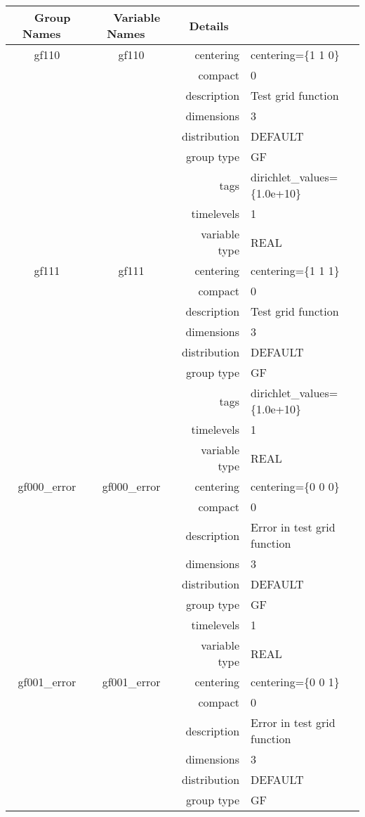 \begin{tabular*}{150mm}{|c|c@{\extracolsep{\fill}}|rl|} \hline 
~ {\bf Group Names} ~ & ~ {\bf Variable Names} ~  &{\bf Details} ~ & ~ \\ 
\hline 
gf110 & gf110 & centering & centering=\{1 1 0\} \\ 
 &  & compact & 0 \\ 
 &  & description & Test grid function \\ 
 &  & dimensions & 3 \\ 
 &  & distribution & DEFAULT \\ 
 &  & group type & GF \\ 
 &  & tags & dirichlet\_values=\{1.0e+10\} \\ 
 &  & timelevels & 1 \\ 
 &  & variable type & REAL \\ 
\hline 
gf111 & gf111 & centering & centering=\{1 1 1\} \\ 
 &  & compact & 0 \\ 
 &  & description & Test grid function \\ 
 &  & dimensions & 3 \\ 
 &  & distribution & DEFAULT \\ 
 &  & group type & GF \\ 
 &  & tags & dirichlet\_values=\{1.0e+10\} \\ 
 &  & timelevels & 1 \\ 
 &  & variable type & REAL \\ 
\hline 
gf000\_error & gf000\_error & centering & centering=\{0 0 0\} \\ 
 &  & compact & 0 \\ 
 &  & description & Error in test grid function \\ 
 &  & dimensions & 3 \\ 
 &  & distribution & DEFAULT \\ 
 &  & group type & GF \\ 
 &  & timelevels & 1 \\ 
 &  & variable type & REAL \\ 
\hline 
gf001\_error & gf001\_error & centering & centering=\{0 0 1\} \\ 
 &  & compact & 0 \\ 
 &  & description & Error in test grid function \\ 
 &  & dimensions & 3 \\ 
 &  & distribution & DEFAULT \\ 
 &  & group type & GF \\ 

\end{tabular*}
